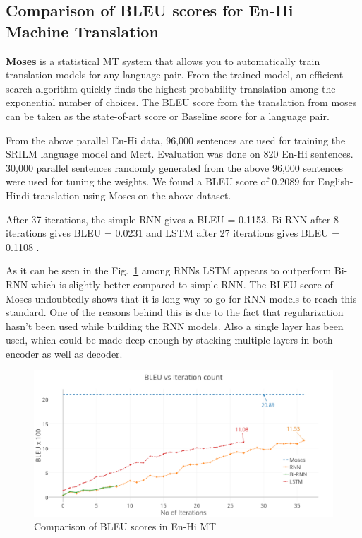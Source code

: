 \documentclass[12pt]{report}
\begin{document}
\subsection{Comparison of BLEU scores for En-Hi Machine Translation}
\textbf{Moses} is a statistical MT system that allows you to automatically train translation models for any language pair. From the trained model, an efficient search algorithm quickly finds the highest probability translation among the exponential number of choices. The BLEU score from the translation from moses can be taken as the state-of-art score or Baseline score for a language pair. 

From the above parallel En-Hi data, 96,000 sentences are used for training the SRILM language model and Mert. Evaluation was done on 820 En-Hi sentences. 30,000 parallel sentences randomly generated from the above 96,000 sentences were used for tuning the weights. 
We found a BLEU score of 0.2089 for English-Hindi translation using Moses on the above dataset.  

After 37 iterations, the simple RNN gives a BLEU = 0.1153. Bi-RNN after 8 iterations gives BLEU = 0.0231 and LSTM after 27 iterations gives BLEU = 0.1108 .

As it can be seen in the Fig.~\ref{BLEU} among RNNs LSTM appears to outperform Bi-RNN which is slightly better compared to simple RNN. The BLEU score of Moses undoubtedly shows that it is long way to go for RNN models to reach this standard. One of the reasons behind this is due to the fact that regularization hasn't been used while building the RNN models. Also a single layer has been used, which could be made deep enough by stacking multiple layers in both encoder as well as decoder. 

\begin{figure}
\centering
\includegraphics[width=6.5in]{1.png}
\caption{Comparison of BLEU scores in En-Hi MT}
\vspace{-0.4cm}
\label{BLEU}
\end{figure}
\end{document}
